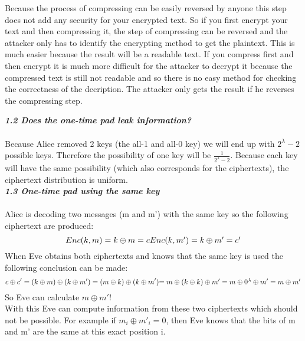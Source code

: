 \documentclass{article}
\begin{document}
\begin{compactenum}[a.)]
		\begin{compactenum}[{}]
			\item Because the process of compressing can be easily reversed by anyone this step does not add any security for your encrypted text. So if you first encrypt your text and then compressing it, the step of compressing can be reversed and the attacker only has to identify the encrypting method to get the plaintext. This is much easier because the result will be a readable text. If you compress first and then encrypt it is much more difficult for the attacker to decrypt it because the compressed text is still not readable and so there is no easy method for checking the correctness of the decription. The attacker only gets the result if he reverses the compressing step.
		\end{compactenum}
	\end{compactenum}
	
	\newpage
	
	\textbf{\textit{1.2 Does the one-time pad leak information?}} \\ \\
	Because Alice removed 2 keys (the all-1 and all-0 key) we will end up with $2^{\lambda}-2$ possible keys. Therefore the possibility of one key will be $\frac{1}{2^{\lambda}-2}$. Because each key will have the same possibility (which also corresponds for the ciphertexts), the ciphertext distribution is uniform.
	\hfill \\
	
	
	\textbf{\textit{1.3 One-time pad using the same key}} \\ \\
	Alice is decoding two messages (m and m') with the same key so the following ciphertext are produced:
	\[
		Enc(k,m) = k \oplus m = c$$ $$
		Enc(k,m') = k \oplus m' = c'
	\]
	When Eve obtains both ciphertexts and knows that the same key is used the following conclusion can be made:
	\[
		c \oplus c' = (k \oplus m) \oplus (k \oplus m') = (m \oplus k) \oplus (k \oplus m') $$ $$
		= m \oplus (k \oplus k) \oplus m' = m \oplus 0^{\lambda} \oplus m' = m \oplus m'
	\]
	So Eve can calculate $m \oplus m'$! \\
	With this Eve can compute information from these two ciphertexts which should not be possible. For example if $m_i \oplus m'_i = 0$, then Eve knows that the bits of m and m' are the same at this exact position i. \\
	
\end{document}
